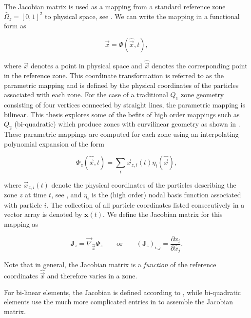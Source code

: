 The Jacobian matrix is used as a mapping from a standard reference zone $\tilde{\Omega_z} = [0,1]^2$ to physical space, see . We can write the mapping in a functional form as 

\begin{equation}
 \vec{x}=\Phi(\hat{\vec{x}},t), \label{eq:parametricMapping}
\end{equation} 

where $\vec{x}$ denotes a point in physical space and $\hat{\vec{x}}$ denotes the corresponding point in the reference zone. This coordinate transformation is referred to as the parametric mapping and is defined by the physical coordinates of the particles associated with each zone. For the case of a traditional $Q_1$ zone geometry consisting of four vertices connected by straight lines, the parametric mapping is bilinear. This thesis explores some of the befits of high order mappings such as $Q_2$ (bi-quadratic) which produce zones with curvilinear geometry as shown in . These parametric mappings are computed for each zone using an interpolating polynomial expansion of the form 

\begin{equation}
 \Phi_z(\hat{\vec{x}},t)=\sum_i \vec{x}_{z,i}(t) \eta_i(\hat{\vec{x}}),
\end{equation}

where $\vec{x}_{z,i}(t)$ denote the physical coordinates of the particles describing the zone $z$ at time $t$, see , and $\eta_i$ is the (high order) nodal basis function associated with particle $i$. The collection of all particle coordinates listed consecutively in a vector array is denoted by $\mathbf{x}(t)$. We define the Jacobian matrix for this mapping as

\begin{equation}
 \mathbf{J}_z=\vec{\nabla}_{\hat{\vec{x}}} \Phi_z \quad\quad \mathrm{or} \quad\quad \left(\mathbf{J}_z\right)_{i,j}=\frac{\partial x_i}{\partial \hat{x}_j} \mathrm{.}
\end{equation}

Note that in general, the Jacobian matrix is a \emph{function} of the reference coordinates $\hat{\vec{x}}$ and therefore varies in a zone. 

For bi-linear elements, the Jacobian is defined according to , while bi-quadratic elements use the much more complicated entries in  to assemble the Jacobian matrix. %

